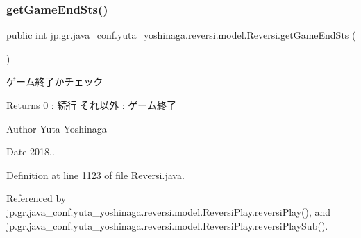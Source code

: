 \subsubsection{\texorpdfstring{get\+Game\+End\+Sts()}{getGameEndSts()}}
{\footnotesize\ttfamily public int jp.\+gr.\+java\+\_\+conf.\+yuta\+\_\+yoshinaga.\+reversi.\+model.\+Reversi.\+get\+Game\+End\+Sts (\begin{DoxyParamCaption}{ }\end{DoxyParamCaption})}



ゲーム終了かチェック 

\begin{DoxyReturn}{Returns}
0 \+: 続行 それ以外 \+: ゲーム終了 
\end{DoxyReturn}
\begin{DoxyAuthor}{Author}
Yuta Yoshinaga 
\end{DoxyAuthor}
\begin{DoxyDate}{Date}
2018.. 
\end{DoxyDate}


Definition at line 1123 of file Reversi.\+java.



Referenced by jp.\+gr.\+java\+\_\+conf.\+yuta\+\_\+yoshinaga.\+reversi.\+model.\+Reversi\+Play.\+reversi\+Play(), and jp.\+gr.\+java\+\_\+conf.\+yuta\+\_\+yoshinaga.\+reversi.\+model.\+Reversi\+Play.\+reversi\+Play\+Sub().

